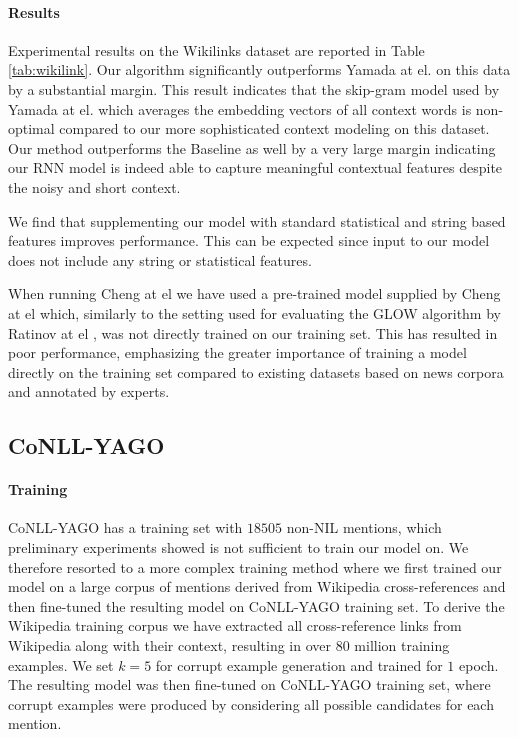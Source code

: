 \documentclass[11pt]{article}
\begin{document}
\paragraph{Results}
Experimental results on the Wikilinks dataset are reported in Table \ref{tab:wikilink}. Our algorithm significantly outperforms Yamada at el. on this data by a substantial margin. This result indicates that the skip-gram model used by Yamada at el. which averages the embedding vectors of all context words is non-optimal compared to our more sophisticated context modeling on this dataset. Our method outperforms the Baseline as well by a very large margin indicating our RNN model is indeed able to capture meaningful contextual features despite the noisy and short context. 

We find that supplementing our model with standard statistical and string based features improves performance. This can be expected since input to our model does not include any string or statistical features. 

When running Cheng at el  we have used a pre-trained model supplied by Cheng at el which, similarly to the setting used for evaluating the GLOW algorithm by Ratinov at el \cite{ratinov2011glow}, was not directly trained on our training set. This has resulted in poor performance, emphasizing the greater importance of training a model directly on the training set compared to existing datasets based on news corpora and annotated by experts.

\subsection{CoNLL-YAGO}
\label{experiments-conll}

\paragraph{Training}
CoNLL-YAGO has a training set with $18505$ non-NIL mentions, which preliminary experiments showed is not sufficient to train our model on. We therefore resorted to a more complex training method where we first trained our model on a large corpus of mentions derived from Wikipedia cross-references and then fine-tuned the resulting model on CoNLL-YAGO training set. To derive the Wikipedia training corpus we have extracted all cross-reference links from Wikipedia along with their context, resulting in over $80$ million training examples. We set $k=5$ for corrupt example generation and trained for $1$ epoch. The resulting model was then fine-tuned on CoNLL-YAGO training set, where corrupt examples were produced by considering all possible candidates for each mention.
\end{document}
